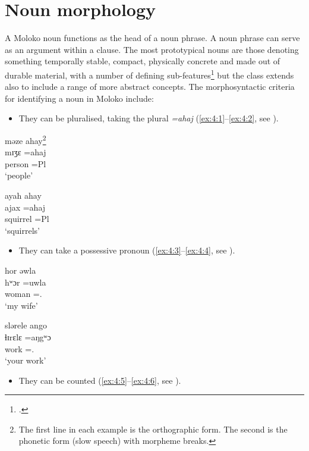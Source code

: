 \chapter[Noun morphology]{Noun morphology}\label{chap:4}
\hypertarget{RefHeading1211341525720847}{}
A Moloko noun functions as the head of a noun phrase. A noun phrase can serve as an argument within a clause.  The most prototypical nouns are those denoting something temporally stable, compact, physically concrete and made out of durable material, with a number of defining sub-features\footnote{\citealt[50--51]{Givon2001}.} but the class extends also to include a range of more abstract concepts. The morphosyntactic criteria for identifying a noun in Moloko include: 

\begin{itemize}
\item They can be pluralised, taking the plural \textit{=ahaj} (\ref{ex:4:1}--\ref{ex:4:2}, see ).
\end{itemize}

\ea \label{ex:4:1}
məze  ahay\footnote{The first line in each example is the orthographic form. The second is the phonetic form (slow speech) with morpheme breaks.}\\
\gll  mɪʒɛ =ahaj\\
      person   =Pl\\
\glt  ‘people’
\z

\ea \label{ex:4:2}
ayah  ahay\\
\gll  ajax    =ahaj\\
      squirrel  =Pl\\
\glt  ‘squirrels’
\z

\begin{itemize}
\item They can take a possessive pronoun (\ref{ex:4:3}--\ref{ex:4:4}, see ).
\end{itemize}

\ea \label{ex:4:3}
hor  əwla\\
\gll  hʷɔr    =uwla\\
      woman  ={\oneS}.{\POSS}\\
\glt  ‘my wife’
\z

\ea \label{ex:4:4}
slərele  ango\\
\gll  ɬɪrɛlɛ  =aŋgʷɔ\\
      work  ={\twoS}.{\POSS}\\
\glt  ‘your work’
\z

\begin{itemize}
\item They can be counted (\ref{ex:4:5}--\ref{ex:4:6}, see ).
\end{itemize}

